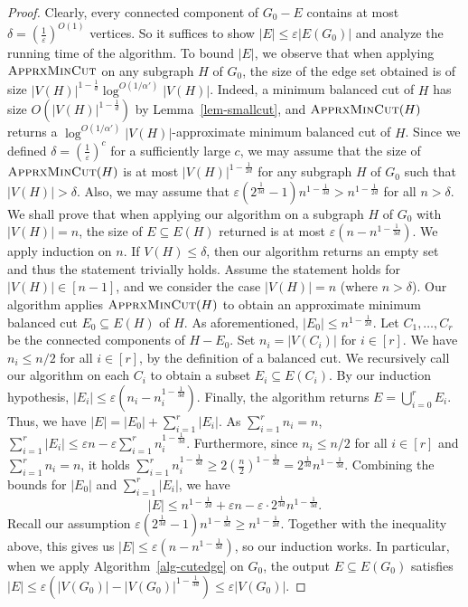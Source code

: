 \documentclass[english]{lipics-v2021}
\begin{document}
\begin{proof}
Clearly, every connected component of $G_0 - E$ contains at most $\delta = (\frac{1}{\varepsilon})^{O(1)}$ vertices.
So it suffices to show $|E| \leq \varepsilon |E(G_0)|$ and analyze the running time of the algorithm.
To bound $|E|$, we observe that when applying $\textsc{ApprxMinCut}$ on any subgraph $H$ of $G_0$, the size of the edge set obtained is of size $|V(H)|^{1-\frac{1}{d}} \log^{O(1/\alpha')} |V(H)|$.
Indeed, a minimum balanced cut of $H$ has size $O(|V(H)|^{1-\frac{1}{d}})$ by Lemma~\ref{lem-smallcut}, and $\textsc{ApprxMinCut}(H)$ returns a $\log^{O(1/\alpha')} |V(H)|$-approximate minimum balanced cut of $H$.
Since we defined $\delta = (\frac{1}{\varepsilon})^c$ for a sufficiently large $c$, we may assume that the size of $\textsc{ApprxMinCut}(H)$ is at most $|V(H)|^{1-\frac{1}{2d}}$ for any subgraph $H$ of $G_0$ such that $|V(H)| > \delta$.
Also, we may assume that $\varepsilon (2^{\frac{1}{3d}}-1) n^{1-\frac{1}{3d}} > n^{1-\frac{1}{2d}}$ for all $n > \delta$.
We shall prove that when applying our algorithm on a subgraph $H$ of $G_0$ with $|V(H)|=n$, the size of $E \subseteq E(H)$ returned is at most $\varepsilon (n - n^{1-\frac{1}{3d}})$.
We apply induction on $n$.
If $V(H) \leq \delta$, then our algorithm returns an empty set and thus the statement trivially holds.
Assume the statement holds for $|V(H)| \in [n-1]$, and we consider the case $|V(H)| = n$ (where $n > \delta$).
Our algorithm applies $\textsc{ApprxMinCut}(H)$ to obtain an approximate minimum balanced cut $E_0 \subseteq E(H)$ of $H$.
As aforementioned, $|E_0| \leq n^{1-\frac{1}{2d}}$.
Let $C_1,\dots,C_r$ be the connected components of $H - E_0$.
Set $n_i = |V(C_i)|$ for $i \in [r]$.
We have $n_i \leq n/2$ for all $i \in [r]$, by the definition of a balanced cut.
We recursively call our algorithm on each $C_i$ to obtain a subset $E_i \subseteq E(C_i)$.
By our induction hypothesis, $|E_i| \leq \varepsilon(n_i - n_i^{1-\frac{1}{3d}})$.
Finally, the algorithm returns $E = \bigcup_{i=0}^r E_i$.
Thus, we have $|E| = |E_0| + \sum_{i=1}^r |E_i|$.
As $\sum_{i=1}^r n_i = n$, $\sum_{i=1}^r |E_i| \leq \varepsilon n - \varepsilon \sum_{i=1}^r n_i^{1-\frac{1}{3d}}$.
Furthermore, since $n_i \leq n/2$ for all $i \in [r]$ and $\sum_{i=1}^r n_i = n$, it holds $\sum_{i=1}^r n_i^{1-\frac{1}{3d}} \geq 2(\frac{n}{2})^{1-\frac{1}{3d}} = 2^{\frac{1}{3d}} n^{1-\frac{1}{3d}}$.
Combining the bounds for $|E_0|$ and $\sum_{i=1}^r |E_i|$, we have
\begin{equation*}
    |E| \leq n^{1-\frac{1}{2d}} + \varepsilon n - \varepsilon \cdot 2^{\frac{1}{3d}} n^{1-\frac{1}{3d}}.
\end{equation*}
Recall our assumption $\varepsilon (2^{\frac{1}{3d}}-1) n^{1-\frac{1}{3d}} \geq n^{1-\frac{1}{2d}}$.
Together with the inequality above, this gives us $|E| \leq \varepsilon (n - n^{1-\frac{1}{3d}})$, so our induction works.
In particular, when we apply Algorithm~\ref{alg-cutedge} on $G_0$, the output $E \subseteq E(G_0)$ satisfies $|E| \leq \varepsilon (|V(G_0)| - |V(G_0)|^{1-\frac{1}{3d}}) \leq \varepsilon |V(G_0)|$.


\end{proof}
\end{document}
